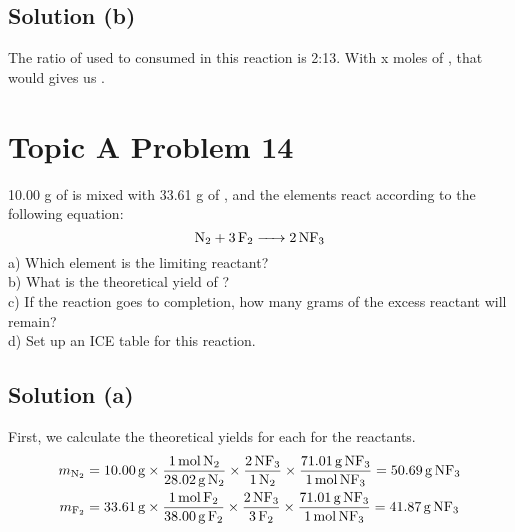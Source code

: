 \documentclass[10pt]{article}
\begin{document}
        \subsection{Solution (b)}
            The ratio of  used to  consumed in this reaction is 2:13.
            With x moles of , that would gives us .

    \pagebreak
    \section{Topic A Problem 14}
        10.00 g of  is mixed with 33.61 g of , and the elements react according to the following equation: 
        \begin{equation}
            \ce{N2 + 3F2 -> 2NF3}
        \end{equation}
        a) Which element is the limiting reactant?\\
        b) What is the theoretical yield of ?\\
        c) If the reaction goes to completion, how many grams of the excess reactant will remain?\\
        d) Set up an ICE table for this reaction.

        \subsection{Solution (a)}
            First, we calculate the theoretical yields for each for the reactants.
            \begin{align}
                m_{\ce{N2}} &=  10.00\,\unit{\gram} \times \frac{1\,\unit{\mole}\,\ce{N2}}{28.02\,\unit{\gram}\,\ce{N2}} 
                                                    \times \frac{2\,\ce{NF3}}{1\,\ce{N2}}
                                                    \times \frac{71.01\,\unit{\gram}\,\ce{NF3}}{1\,\unit{\mole}\,\ce{NF3}}
                    =   50.69\,\unit{\gram}\,\ce{NF3}
                \\
                m_{\ce{F2}} &=  33.61\,\unit{\gram} \times \frac{1\,\unit{\mole}\,\ce{F2}}{38.00\,\unit{\gram}\,\ce{F2}} 
                                                    \times \frac{2\,\ce{NF3}}{3\,\ce{F2}}
                                                    \times \frac{71.01\,\unit{\gram}\,\ce{NF3}}{1\,\unit{\mole}\,\ce{NF3}}
                    =   41.87\,\unit{\gram}\,\ce{NF3}
            \end{align}
\end{document}
